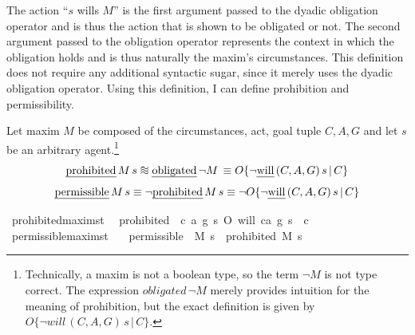 \begin{isabellebody}
\begin{isamarkuptext}
The action ``$s$ wills $M$'' is the first argument passed to the dyadic obligation operator and is 
thus the action that is shown to be obligated or not. The second argument passed to the obligation 
operator represents the context in which the obligation holds and is thus naturally the maxim's circumstances.
This definition does not require any additional syntactic sugar, since it merely uses the dyadic obligation
operator. Using this definition, I can define prohibition and permissibility.

\begin{definition} Let maxim $M$ be composed of the circumstances, act, 
goal tuple $C, A, G$ and let $s$ be an arbitrary agent.\footnote{Technically, a maxim is not a boolean 
type, so the term $\neg M$ is not type correct. The expression $obligated \, \neg M$ merely provides 
intuition for the meaning of prohibition, but the exact definition is given by 
$O\{ \neg will \, (C, A, G) \, s \, | \, C\}$.}
\newcommand*{\approxident}{%
  \mathrel{\vcenter{\offinterlineskip
  \hbox{$\sim$}\vskip-.35ex\hbox{$\sim$}\vskip-.35ex\hbox{$\sim$}}}}
$$\text{\emph{prohibited}} \, M \, s \approxident \text{\emph{obligated}} \, \neg M \, \equiv O\{ \neg \text{\emph{will}} \, (C, A, G) \, s \, | \, C\}$$
$$\text{\emph{permissible}} \, M \, s \equiv \neg \text{\emph{prohibited}} \, M \, s \equiv \neg O\{ \neg \text{\emph{will}} \, (C, A, G) \, s \, | \, C\}$$
\end{definition}%
\end{isamarkuptext}\isamarkuptrue%
\isamarkupfalse%
\ prohibited{\isacharcolon}{\isacharcolon}{\isachardoublequoteopen}maxim{\isasymRightarrow}s{\isasymRightarrow}t{\isachardoublequoteclose}\ \ \isanewline
{\isachardoublequoteopen}prohibited\ {\isasymequiv}\ {\isasymlambda}{\isacharparenleft}c{\isacharcomma}\ a{\isacharcomma}\ g{\isacharparenright}\ s{\isachardot}\ O{\isacharbraceleft}\isactrlbold {\isasymnot}\ {\isacharparenleft}will\ {\isacharparenleft}c{\isacharcomma}a{\isacharcomma}\ g{\isacharparenright}\ s{\isacharparenright}\ {\isacharbar}\ c{\isacharbraceright}{\isachardoublequoteclose}\isanewline
%
\isanewline
{}\isamarkupfalse%
\ permissible{\isacharcolon}{\isacharcolon}{\isachardoublequoteopen}maxim{\isasymRightarrow}s{\isasymRightarrow}t{\isachardoublequoteclose}\isanewline
\ \ \ {\isachardoublequoteopen}permissible\ {\isasymequiv}\ {\isasymlambda}M\ s{\isachardot}\ \isactrlbold {\isasymnot}\ {\isacharparenleft}prohibited\ M\ s{\isacharparenright}{\isachardoublequoteclose}\isanewline

\end{isabellebody}
